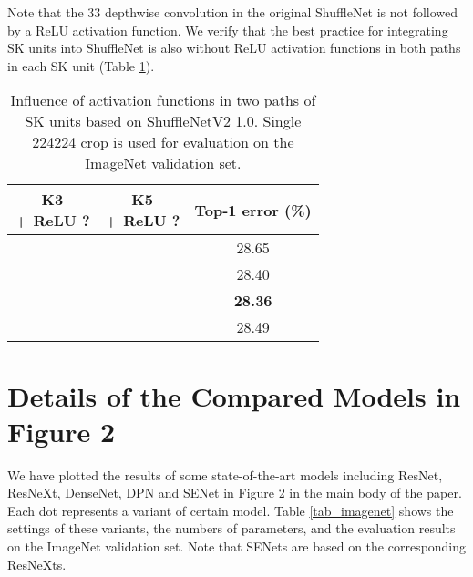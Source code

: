 \documentclass[10pt,twocolumn,letterpaper]{article}
\newcommand{\cmark}{\ding{51}}\newcommand{\xmark}{\ding{55}}\makeatletter
\begin{document}
Note that the 33 depthwise convolution in the original ShuffleNet is not followed by a ReLU activation function. We verify that the best practice for integrating SK units into ShuffleNet is also without ReLU activation functions in both paths in each SK unit (Table \ref{tab_relu}). 

\begin{table}[h]
\small
	\centering
	\renewcommand\arraystretch{1.1}
	\newcommand{\tabincell}[2]{\begin{tabular}{@{}#1@{}}#2\end{tabular}}
	\begin{tabular}{c|c|c}
		\hline
		\makecell[c]{K3\\+ ReLU ?}&\makecell[c]{K5\\+ ReLU ?}& Top-1 error (\%) \\
		\hline
		\cmark&\xmark&28.65\\
		\hline
		\xmark&\cmark&28.40\\
		\hline
		\xmark&\xmark&\bf{28.36}\\
		\hline
		\cmark&\cmark&28.49\\
		\hline
	\end{tabular}
	\vspace{+4pt}
	\caption{Influence of activation functions in two paths of SK units based on ShuffleNetV2 1.0. Single 224224 crop is used for evaluation on the ImageNet validation set.}
	\label{tab_relu}
	\vspace{-4pt}
\end{table}

\section{Details of the Compared Models in Figure 2}
We have plotted the results of some state-of-the-art models including ResNet, ResNeXt, DenseNet, DPN and  SENet  in  Figure 2 in the main body of the paper. Each dot represents a variant of certain model.  Table \ref{tab_imagenet} shows the settings of these variants, the numbers of parameters, and the evaluation results on the ImageNet validation set. Note that SENets are based on the corresponding ResNeXts. 
\end{document}

